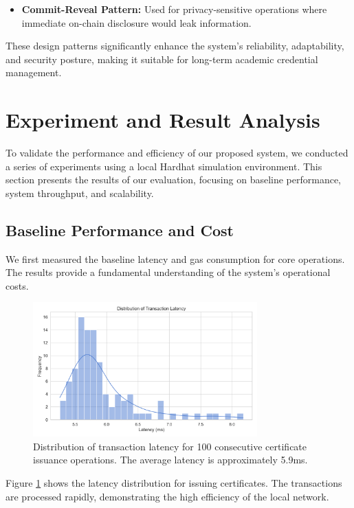\documentclass[lettersize,journal]{IEEEtran}
\begin{document}
\begin{itemize}
\begin{itemize}
    \item \textbf{Commit-Reveal Pattern:} Used for privacy-sensitive operations where immediate on-chain disclosure would leak information.
\end{itemize}

These design patterns significantly enhance the system's reliability, adaptability, and security posture, making it suitable for long-term academic credential management.

\section{Experiment and Result Analysis}
To validate the performance and efficiency of our proposed system, we conducted a series of experiments using a local Hardhat simulation environment. This section presents the results of our evaluation, focusing on baseline performance, system throughput, and scalability.

\subsection{Baseline Performance and Cost}
We first measured the baseline latency and gas consumption for core operations. The results provide a fundamental understanding of the system's operational costs.

\begin{figure}[!h]
\centering
\includegraphics[width=3.4in]{figures/latency_distribution.png}
\caption{Distribution of transaction latency for 100 consecutive certificate issuance operations. The average latency is approximately 5.9ms.}
\label{fig:latency_dist}
\end{figure}

Figure \ref{fig:latency_dist} shows the latency distribution for issuing certificates. The transactions are processed rapidly, demonstrating the high efficiency of the local network.


\end{itemize}
\end{document}
